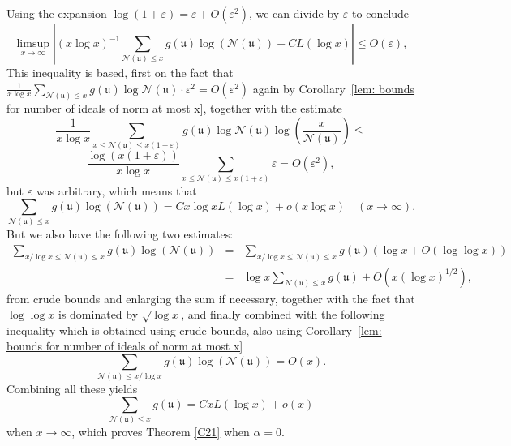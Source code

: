 \documentclass[11pt]{amsart}
\theoremstyle{definition}
\newcommand{\NN}{{\mathcal N}}
\newcommand{\mf}{\mathfrak}
\begin{document}
Using the expansion $\log(1+\varepsilon)=\varepsilon+O(\varepsilon^2)$, we can divide by $\varepsilon$ to conclude
\[
\limsup_{x \to \infty} \left| (x\log x)^{-1}\sum_{\NN(\mf u) \leq x} g(\mf u)\log(\NN(\mf u))-CL(\log x)\right| \leq O(\varepsilon),
\]
This inequality is based, first on the fact that $\frac{1}{x\log x}\sum_{\NN(\mf u) \leq x} g(\mf u)\log \NN(\mf u) \cdot \varepsilon^2=O(\varepsilon^2)$ again by Corollary~\ref{lem: bounds for number of ideals of norm at most x}, together with the estimate
\[
\frac{1}{x\log x}\sum_{x \leq \NN(\mf u) \leq x(1+\varepsilon)} g(\mf u) \log \NN(\mf u) \log \left(\frac{x}{\NN(\mf u)}\right) \leq \]
\[
\frac{\log (x(1+\varepsilon))}{x\log x}\sum_{x \leq \NN(\mf u) \leq x(1+\varepsilon)} \varepsilon  = O(\varepsilon^2),
\]
but $\varepsilon$ was arbitrary, which means that
\[
\sum_{\NN(\mf u) \leq x} g(\mf u)\log(\NN(\mf u)) =Cx\log xL(\log x)+o(x\log x) \quad (x \to \infty).
\]
But we also have the following two estimates:
\begin{eqnarray*}
    \sum_{x/\log x \leq \NN(\mf u) \leq x} g(\mf u)\log(\NN(\mf u)) & = & \sum_{x/\log x \leq \NN(\mf u) \leq x} g(\mf u)(\log x+ O(\log \log x)) \\ & = &
\log x \sum_{\NN(\mf u) \leq x}g(\mf u) + O(x(\log x)^{1/2}),
\end{eqnarray*}
from crude bounds and enlarging the sum if necessary, together with the fact that $\log\log x$ is dominated by $\sqrt{\log x}$, and finally combined with the following inequality which is obtained using crude bounds, also using Corollary~\ref{lem: bounds for number of ideals of norm at most x}
\[
\sum_{\NN(\mf u) \leq x/ \log x}g(\mf u) \log(\NN(\mf u)) = O(x).
\]
Combining all these yields
\[
\sum_{\NN(\mf u)\leq x} g(\mf u) = CxL(\log x)+o(x)
\]
when $x \to \infty$, which proves Theorem \ref{C21} when $\alpha=0$.

\
\end{document}
